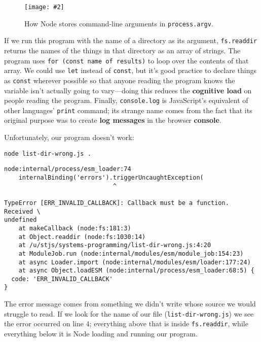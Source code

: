 \documentclass[krantzl]{krantz}
\newcommand{\figpdf}[4]{\begin{figure}%
\centering%
\texttt{[image: \#2]}%
\caption{#3}%
\label{#1}%
\end{figure}}
\newcommand{\glossref}[1]{\textbf{#1}}
\begin{document}
\figpdf{systems-programming-process-argv}{./systems-programming/process-argv.pdf}{How Node stores command-line arguments in \texttt{process.argv}.}{0.6}


\newpage


If we run this program with the name of a directory as its argument,
\texttt{fs.readdir} returns the names of the things in that directory as an array of strings.
The program uses \texttt{for (const name of results)} to loop over the contents of that array.
We could use \texttt{let} instead of \texttt{const},
but it's good practice to declare things as \texttt{const} wherever possible
so that anyone reading the program knows the variable isn't actually going to vary---doing
this reduces the \glossref{cognitive load} on people reading the program.
Finally,
\texttt{console.log} is JavaScript's equivalent of other languages' \texttt{print} command;
its strange name comes from the fact that
its original purpose was to create \glossref{log messages} in the browser \glossref{console}.


Unfortunately,
our program doesn't work:


\begin{lstlisting}[frame=single,frameround=tttt]
node list-dir-wrong.js .
\end{lstlisting}



\begin{lstlisting}[frame=single,frameround=tttt]
node:internal/process/esm_loader:74
    internalBinding('errors').triggerUncaughtException(
                              ^

TypeError [ERR_INVALID_CALLBACK]: Callback must be a function. Received \
undefined
    at makeCallback (node:fs:181:3)
    at Object.readdir (node:fs:1030:14)
    at /u/stjs/systems-programming/list-dir-wrong.js:4:20
    at ModuleJob.run (node:internal/modules/esm/module_job:154:23)
    at async Loader.import (node:internal/modules/esm/loader:177:24)
    at async Object.loadESM (node:internal/process/esm_loader:68:5) {
  code: 'ERR_INVALID_CALLBACK'
}
\end{lstlisting}



\noindent The error message comes from something we didn't write whose source we would struggle to read.
If we look for the name of our file (\texttt{list-dir-wrong.js})
we see the error occurred on line 4;
everything above that is inside \texttt{fs.readdir},
while everything below it is Node loading and running our program.
\end{document}
